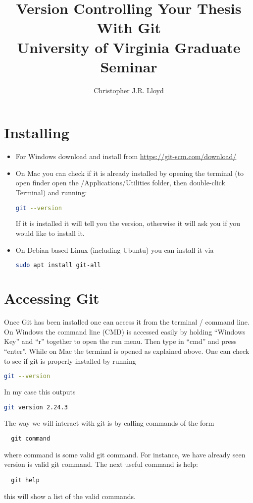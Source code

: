 \documentclass{article}
\title{Version Controlling Your Thesis With Git\\ {\large University of
  Virginia Graduate Seminar}}
\author{Christopher J.R. Lloyd}
\begin{document}
\maketitle
\section{Installing}
\begin{itemize}
\item For Windows download and install from \href{https://git-scm.com/download/}{https://git-scm.com/download/}
\item On Mac you can check if it is already installed by opening the
  terminal (to open finder open the /Applications/Utilities folder,
  then double-click Terminal) and running:
\begin{lstlisting}[language=bash]
  git --version
\end{lstlisting}
If it is installed it will tell you the version, otherwise it will ask
you if you would like to install it.
\item On Debian-based Linux (including Ubuntu) you can install it via
\begin{lstlisting}[language=bash]
  sudo apt install git-all
\end{lstlisting}
\end{itemize}
\section{Accessing Git}
Once Git has been installed one can access it from the terminal /
command line. On Windows the command line (CMD) is accessed easily by
holding ``Windows Key'' and ``r'' together to open the run menu. Then
type in ``cmd'' and press ``enter''. While on Mac the terminal is
opened as explained above. One can check to see if git is properly
installed by running
\begin{lstlisting}[language=bash]
  git --version
\end{lstlisting}
In my case this outputs 
\begin{lstlisting}[language=bash]
  git version 2.24.3
\end{lstlisting}
The way we will interact with git is by calling commands of the form
\begin{lstlisting}
  git command
\end{lstlisting}
where command is some valid git command. For instance, we have already
seen version is valid git command. The next useful command is help:
\begin{lstlisting}
  git help
\end{lstlisting}
this will show a list of the valid commands.
\end{document}
